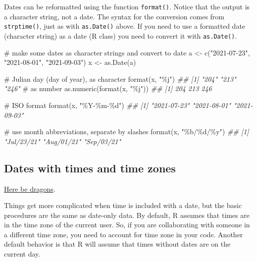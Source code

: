 \documentclass[
  13,
  letterpaper,
]{report}
\newenvironment{Shaded}{\begin{snugshade}}{\end{snugshade}}
\newcommand{\CommentTok}[1]{\textcolor[rgb]{0.37,0.37,0.37}{#1}}
\newcommand{\DocumentationTok}[1]{\textcolor[rgb]{0.37,0.37,0.37}{\textit{#1}}}
\newcommand{\FunctionTok}[1]{\textcolor[rgb]{0.28,0.35,0.67}{#1}}
\newcommand{\NormalTok}[1]{\textcolor[rgb]{0.00,0.23,0.31}{#1}}
\newcommand{\OtherTok}[1]{\textcolor[rgb]{0.00,0.23,0.31}{#1}}
\newcommand{\StringTok}[1]{\textcolor[rgb]{0.13,0.47,0.30}{#1}}
\begin{document}
Dates can be reformatted using the function \texttt{format()}. Notice
that the output is a character string, not a date. The syntax for the
conversion comes from \texttt{strptime()}, just as with
\texttt{as.Date()} above. If you need to use a formatted date (character
string) as a date (R class) you need to convert it with
\texttt{as.Date()}.

\begin{Shaded}
\begin{Highlighting}[]

\CommentTok{\# make some dates as character strings and convert to date}
\NormalTok{a }\OtherTok{\textless{}{-}} \FunctionTok{c}\NormalTok{(}\StringTok{"2021{-}07{-}23"}\NormalTok{, }\StringTok{"2021{-}08{-}01"}\NormalTok{, }\StringTok{"2021{-}09{-}03"}\NormalTok{)}
\NormalTok{x }\OtherTok{\textless{}{-}} \FunctionTok{as.Date}\NormalTok{(a)}

\CommentTok{\# Julian day (day of year), as character}
\FunctionTok{format}\NormalTok{(x, }\StringTok{"\%j"}\NormalTok{)}
\DocumentationTok{\#\# [1] "204" "213" "246"}
\CommentTok{\# as number}
\FunctionTok{as.numeric}\NormalTok{(}\FunctionTok{format}\NormalTok{(x, }\StringTok{"\%j"}\NormalTok{))}
\DocumentationTok{\#\# [1] 204 213 246}

\CommentTok{\# ISO format}
\FunctionTok{format}\NormalTok{(x, }\StringTok{"\%Y{-}\%m{-}\%d"}\NormalTok{)}
\DocumentationTok{\#\# [1] "2021{-}07{-}23" "2021{-}08{-}01" "2021{-}09{-}03"}

\CommentTok{\# use month abbreviations, separate by slashes}
\FunctionTok{format}\NormalTok{(x, }\StringTok{"\%b/\%d/\%y"}\NormalTok{)}
\DocumentationTok{\#\# [1] "Jul/23/21" "Aug/01/21" "Sep/03/21"}
\end{Highlighting}
\end{Shaded}

\subsection{Dates with times and time zones}\label{sec-manip-date-time}

\href{https://en.wikipedia.org/wiki/Here_be_dragons}{Here be dragons}.

Things get more complicated when time is included with a date, but the
basic procedures are the same as date-only data. By default, R assumes
that times are in the time zone of the current user. So, if you are
collaborating with someone in a different time zone, you need to account
for time zone in your code. Another default behavior is that R will
assume that times without dates are on the current day.
\end{document}
